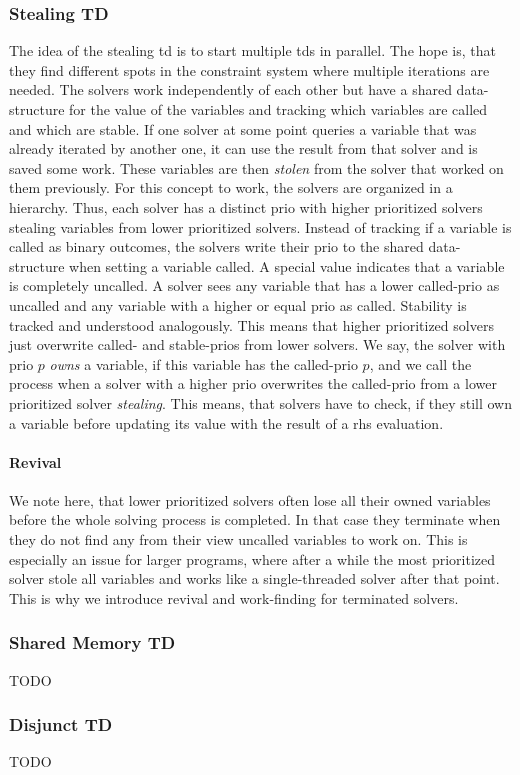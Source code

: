     \subsubsection{Stealing TD}
    \label{sec:method:td_parallel:stealing}
    The idea of the stealing \ac{td} is to start multiple \acp{td} in parallel. The hope is, that they find different spots in the constraint system where multiple iterations are needed. The solvers work independently of each other but have a shared data-structure for the value of the variables and tracking which variables are called and which are stable. If one solver at some point queries a variable that was already iterated by another one, it can use the result from that solver and is saved some work. These variables are then \textit{stolen} from the solver that worked on them previously.
    For this concept to work, the solvers are organized in a hierarchy. Thus, each solver has a distinct \ac{prio} with higher prioritized solvers stealing variables from lower prioritized solvers. Instead of tracking if a variable is called as binary outcomes, the solvers write their \ac{prio} to the shared data-structure when setting a variable called. A special value indicates that a variable is completely uncalled. A solver sees any variable that has a lower called-\ac{prio} as uncalled and any variable with a higher or equal \ac{prio} as called. Stability is tracked and understood analogously. This means that higher prioritized solvers just overwrite called- and stable-\acp{prio} from lower solvers. 
    We say, the solver with prio $p$ \textit{owns} a variable, if this variable has the called-\ac{prio} $p$, and we call the process when a solver with a higher \ac{prio} overwrites the called-\ac{prio} from a lower prioritized solver \textit{stealing}. This means, that solvers have to check, if they still own a variable before updating its value with the result of a \ac{rhs} evaluation.

    \paragraph{Revival} We note here, that lower prioritized solvers often lose all their owned variables before the whole solving process is completed. In that case they terminate when they do not find any from their view uncalled variables to work on. This is especially an issue for larger programs, where after a while the most prioritized solver stole all variables and works like a single-threaded solver after that point. This is why we introduce revival and work-finding for terminated solvers.

    \subsubsection{Shared Memory TD}
    \label{sec:method:td_parallel:sharedMem}
    TODO

    \subsubsection{Disjunct TD}
    \label{sec:method:td_parallel:disjunct}
    TODO
